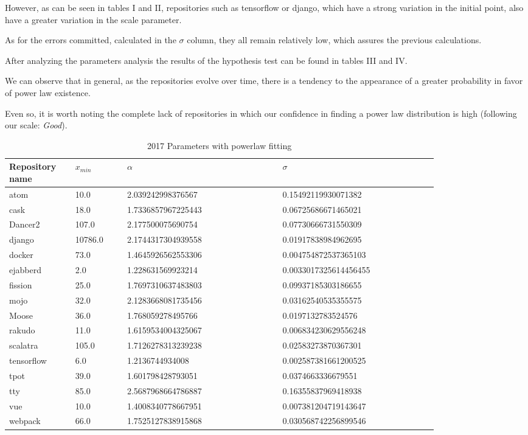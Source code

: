 \documentclass[conference]{IEEEtran}
\begin{document}
However, as can be seen in tables I and II, repositories such as tensorflow or django, which have a strong variation in the initial point, also have a greater variation in the scale parameter. %

As for the errors committed, calculated in the $\sigma$ column, they all remain relatively low, which assures the previous calculations.

After analyzing the parameters analysis the results of the hypothesis test can be found in tables III and IV. %

We can observe that in general, as the repositories evolve over time, there is a tendency to the appearance of a greater probability in favor of power law existence.

Even so, it is worth noting the complete lack of repositories in which our confidence in finding a power law distribution is high (following our scale: \textit{Good}).

\begin{table}[htbp]
	\caption{2017 Parameters with powerlaw fitting}
	\begin{center}
		\begin{tabular}{| p{0.12\linewidth} | p{0.1\linewidth} | p{0.3\linewidth} | p{0.3\linewidth} |}
			\hline
Repository name &$x_{min}$ & $\alpha$ & $\sigma$\\
\hline
atom &10.0 &2.039242998376567  &0.15492119930071382 \\
cask &18.0 &1.7336857967225443  &0.06725686671465021 \\
Dancer2 &107.0 &2.177500075690754  &0.07730666731550309 \\
django &10786.0 &2.1744317304939558  &0.01917838984962695 \\
docker &73.0 &1.4645926562553306  &0.004754872537365103\\
ejabberd &2.0 &1.228631569923214  &0.0033017325614456455 \\
fission &25.0 &1.7697310637483803  &0.09937185303186655 \\
mojo &32.0 &2.1283668081735456  &0.03162540535355575 \\
Moose &36.0 &1.768059278495766  &0.0197132783524576 \\
rakudo &11.0 &1.6159534004325067  &0.006834230629556248 \\
scalatra &105.0 &1.7126278313239238  &0.02583273870367301 \\
tensorflow &6.0 &1.2136744934008  &0.002587381661200525 \\
tpot &39.0 &1.601798428793051 &0.0374663336679551 \\
tty &85.0 &2.5687968664786887  &0.16355837969418938 \\
vue &10.0 &1.4008340778667951  &0.007381204719143647\\
webpack &66.0 &1.7525127838915868 &0.030568742256899546\\ 
			\hline
		\end{tabular}
	\end{center}
\label{tab:2017pars}
\end{table}
\end{document}
